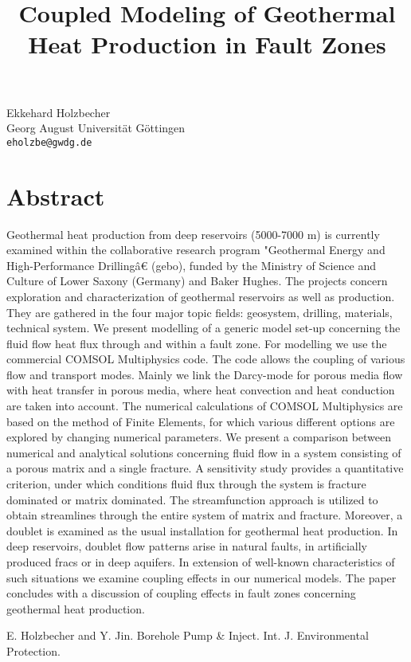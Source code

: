 \title{Coupled Modeling of Geothermal Heat Production in Fault Zones}
 \author{} \institute{}
\maketitle
\begin{center}
{\large Ekkehard Holzbecher}\\
Georg August Universit\"at G\"ottingen\\
{\tt eholzbe@gwdg.de}

\end{center}

\section*{Abstract}

Geothermal heat production from deep reservoirs (5000-7000 m) is currently examined within the collaborative research program "Geothermal Energy and High-Performance Drillingâ€ (gebo), funded by the Ministry of Science and Culture of Lower Saxony (Germany) and Baker Hughes. The projects concern exploration and characterization of geothermal reservoirs as well as production. They are gathered in the four major topic fields: geosystem, drilling, materials, technical system. We present modelling of a generic model set-up concerning the fluid flow heat flux through and within a fault zone. 
For modelling we use the commercial COMSOL Multiphysics code. The code allows the coupling of various flow and transport modes. Mainly we link the Darcy-mode for porous media flow with heat transfer in porous media, where heat convection and heat conduction are taken into account. The numerical calculations of COMSOL Multiphysics are based on the method of Finite Elements, for which various different options are explored by changing numerical parameters.
We present a comparison between numerical and analytical solutions concerning fluid flow in a system consisting of a porous matrix and a single fracture. A sensitivity study provides a quantitative criterion, under which conditions fluid flux through the system is fracture dominated or matrix dominated. The streamfunction approach is utilized to obtain streamlines through the entire system of matrix and fracture. 
Moreover, a doublet is examined as the usual installation for geothermal heat production. In deep reservoirs, doublet flow patterns arise in natural faults, in artificially produced fracs or in deep aquifers. In extension of well-known characteristics of such situations we examine coupling effects in our numerical models.
The paper concludes with a discussion of coupling effects in fault zones concerning geothermal heat production. 



\begin{thebibliography}{10}

{\sc E. Holzbecher and Y. Jin}. {Borehole Pump \& Inject}. Int. J. Environmental Protection.

\end{thebibliography}
